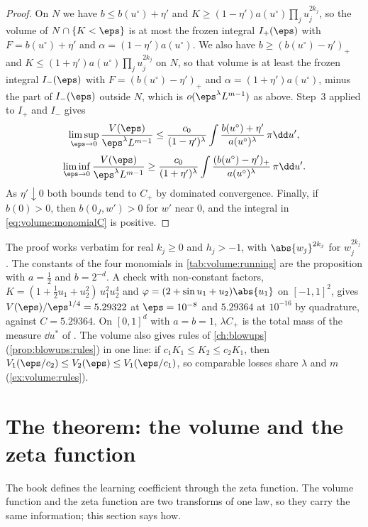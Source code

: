\begin{refsection}
\begin{proof}
On $N$ we have $b\le b(u^\circ)+\eta'$ and $K\ge(1-\eta')a(u^\circ)\prod_ju_j^{2k_j}$, so the volume of $N\cap\{K<\eps\}$ is at most the frozen integral $I_+(\eps)$ with $F=b(u^\circ)+\eta'$ and $\alpha=(1-\eta')a(u^\circ)$. We also have $b\ge(b(u^\circ)-\eta')_+$ and $K\le(1+\eta')a(u^\circ)\prod_ju_j^{2k_j}$ on $N$, so that volume is at least the frozen integral $I_-(\eps)$ with $F=(b(u^\circ)-\eta')_+$ and $\alpha=(1+\eta')a(u^\circ)$, minus the part of $I_-(\eps)$ outside $N$, which is $o(\eps^\lambda L^{m-1})$ as above. Step~3 applied to $I_+$ and $I_-$ gives
\[
\limsup_{\eps\to0}\frac{V(\eps)}{\eps^\lambda L^{m-1}}\le\frac{c_0}{(1-\eta')^\lambda}\int\frac{b(u^\circ)+\eta'}{a(u^\circ)^\lambda}\,\pi\dd u',
\]
\[
\liminf_{\eps\to0}\frac{V(\eps)}{\eps^\lambda L^{m-1}}\ge\frac{c_0}{(1+\eta')^\lambda}\int\frac{(b(u^\circ)-\eta')_+}{a(u^\circ)^\lambda}\,\pi\dd u'.
\]
As $\eta'\downarrow0$ both bounds tend to $C_+$ by dominated convergence. Finally, if $b(0)>0$, then $b(0_J,w')>0$ for $w'$ near $0$, and the integral in \eqref{eq:volume:monomialC} is positive.
\end{proof}

The proof works verbatim for real $k_j\ge0$ and $h_j>-1$, with $\abs{w_j}^{2k_j}$ for $w_j^{2k_j}$. The constants of the four monomials in \cref{tab:volume:running} are the proposition with $a=\frac12$ and $b=2^{-d}$. A check with non-constant factors, $K=(1+\frac12u_1+u_2^2)\,u_1^2u_2^4$ and $\varphi=(2+\sin u_1+u_2)\abs{u_1}$ on $[-1,1]^2$, gives $V(\eps)/\eps^{1/4}=5.29322$ at $\eps=10^{-8}$ and $5.29364$ at $10^{-16}$ by quadrature, against $C=5.29364$. On $[0,1]^d$ with $a=b=1$, $\lambda C_+$ is the total mass of the measure $\dd u^*$ of \textcite[Lemma~4]{Watanabe2013}. The volume also gives rules of \cref{ch:blowups} (\cref{prop:blowups:rules}) in one line: if $c_1K_1\le K_2\le c_2K_1$, then $V_1(\eps/c_2)\le V_2(\eps)\le V_1(\eps/c_1)$, so comparable losses share $\lambda$ and $m$ (\cref{ex:volume:rules}).

\section{The theorem: the volume and the zeta function}\label{sec:volume:zeta}

The book defines the learning coefficient through the zeta function. The volume function and the zeta function are two transforms of one law, so they carry the same information; this section says how.


\end{refsection}
